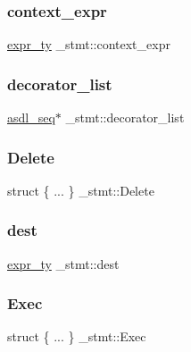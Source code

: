 \mbox{\label{struct__stmt_a2df3be632234b161842c0cc1646819eb}} 
\subsubsection{\texorpdfstring{context\_expr}{context\_expr}}
{\footnotesize\ttfamily \mbox{\hyperlink{_python-ast_8h_a56d3705e020a071405094a220c4592bd}{expr\+\_\+ty}} \+\_\+stmt\+::context\+\_\+expr}

\mbox{\label{struct__stmt_a739b41aa7343830a6bcfb7833155ba86}} 
\subsubsection{\texorpdfstring{decorator\_list}{decorator\_list}}
{\footnotesize\ttfamily \mbox{\hyperlink{structasdl__seq}{asdl\+\_\+seq}}$\ast$ \+\_\+stmt\+::decorator\+\_\+list}

\mbox{\label{struct__stmt_abf4fc1be2723e72bb04b0767a0400a92}} 
\subsubsection{\texorpdfstring{Delete}{Delete}}
{\footnotesize\ttfamily struct \{ ... \}   \+\_\+stmt\+::\+Delete}

\mbox{\label{struct__stmt_a760c7987187a06e882bfcbab14b7fdb9}} 
\subsubsection{\texorpdfstring{dest}{dest}}
{\footnotesize\ttfamily \mbox{\hyperlink{_python-ast_8h_a56d3705e020a071405094a220c4592bd}{expr\+\_\+ty}} \+\_\+stmt\+::dest}

\mbox{\label{struct__stmt_ac77ed6ca345034c90ad9df8e5f1f00fd}} 
\subsubsection{\texorpdfstring{Exec}{Exec}}
{\footnotesize\ttfamily struct \{ ... \}   \+\_\+stmt\+::\+Exec}

